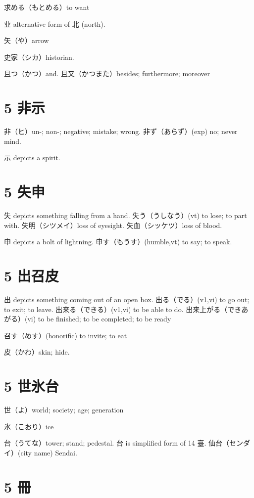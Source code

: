 求める（もとめる）to want

业 alternative form of 北 (north).

矢（や）arrow

史家（シカ）historian.

且つ（かつ）and.
且又（かつまた）besides; furthermore; moreover

\section{5 非⽰}

非（ヒ）un-; non-; negative; mistake; wrong.
非ず（あらず）(exp) no; never mind.

⽰ depicts a spirit.

\section{5 失申}

失 depicts something falling from a hand.
失う（うしなう）(vt) to lose; to part with.
失明（シツメイ）loss of eyesight.
失血（シッケツ）loss of blood.

申 depicts a bolt of lightning.
申す（もうす）(humble,vt) to say; to speak.

\section{5 出召皮}

出 depicts something coming out of an open box.
出る（でる）(v1,vi) to go out; to exit; to leave.
出来る（できる）(v1,vi) to be able to do.
出来上がる（できあがる）(vi) to be finished; to be completed; to be ready

召す（めす）(honorific) to invite; to eat

皮（かわ）skin; hide.

\section{5 世氷台}

世（よ）world; society; age; generation

氷（こおり）ice

台（うてな）tower; stand; pedestal.
台 is simplified form of 14 臺.
仙台（センダイ）(city name) Sendai.

\section{5 冊}

